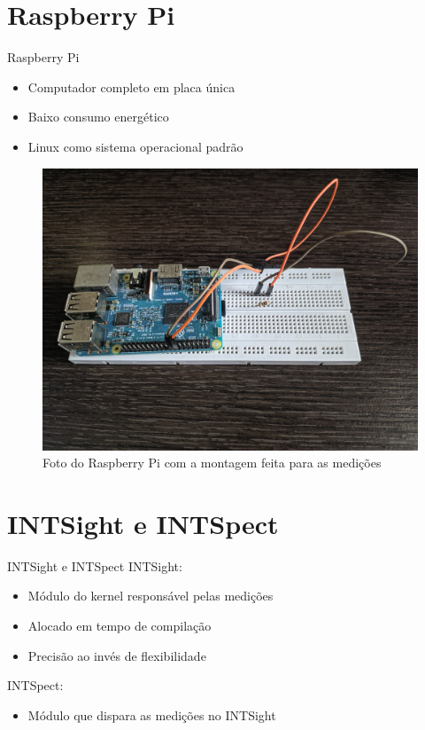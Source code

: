 \documentclass[12pt,brazil]{beamer}
\begin{document}
\section{Raspberry Pi}
\begin{frame}{Raspberry Pi}
    \begin{itemize}
        \item Computador completo em placa única
        \item Baixo consumo energético
        \item Linux como sistema operacional padrão
    \end{itemize}
    
    \begin{figure}[!htb]
        \centering
        \includegraphics[width=.6\textwidth]{figures/raspberry-photo.jpg}
        \caption*{Foto do Raspberry Pi com a montagem feita para as medições}
        \label{foto:Raspberry Pi}
    \end{figure}
\end{frame}

\section{INTSight e INTSpect}
\begin{frame}{INTSight e INTSpect}
         INTSight:
        \begin{itemize}
            \item Módulo do kernel responsável pelas medições
            \item Alocado em tempo de compilação
            \item Precisão ao invés de flexibilidade
        \end{itemize}
         INTSpect:
        \begin{itemize}
            \item Módulo que dispara as medições no INTSight
        \end{itemize}
\end{frame}
\end{document}
